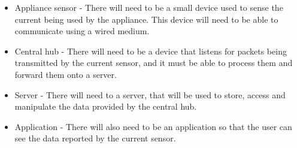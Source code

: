 \documentclass[preprint,12pt,3p]{elsarticle}
\begin{document}
\begin{itemize}
\item Appliance sensor - There will need to be a small device used to sense the current being used by the appliance. This device will need to be able to communicate using a wired medium.
\item Central hub - There will need to be a device that listens for packets being transmitted by the current sensor, and it must be able to process them and forward them onto a server.
\item Server - There will need to a server, that will be used to store, access and manipulate the data provided by the central hub.
\item Application - There will also need to be an application so that the user can see the data reported by the current sensor.
\end{itemize}
\end{document}
